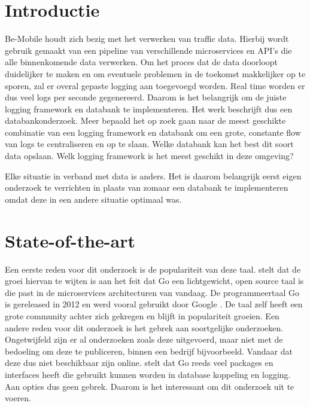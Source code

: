 
\section{Introductie} %
\label{sec:introductie}
Be-Mobile houdt zich bezig met het verwerken van traffic data. Hierbij wordt gebruik gemaakt van een pipeline van verschillende microservices en API's die alle binnenkomende data verwerken. Om het proces dat de data doorloopt duidelijker te maken en om eventuele problemen in de toekomst makkelijker op te sporen, zal er overal gepaste logging aan toegevoegd worden. Real time worden er dus veel logs per seconde gegenereerd. Daarom is het belangrijk om de juiste logging framework en databank te implementeren. Het werk beschrijft dus een databankonderzoek. Meer bepaald het op zoek gaan naar de meest geschikte combinatie van een logging framework en databank om een grote, constante flow van logs te centraliseren en op te slaan. Welke databank kan het best dit soort data opslaan. Welk logging framework is het meest geschikt in deze omgeving?
 
 Elke situatie in verband met data is anders. Het is daarom belangrijk eerst eigen onderzoek te verrichten in plaats van zomaar een databank te implementeren omdat deze in een andere situatie optimaal was.

\section{State-of-the-art}
\label{sec:state-of-the-art}
Een eerste reden voor dit onderzoek is de populariteit van deze taal. \textcite{Rouse} stelt dat de groei hiervan te wijten is aan het feit dat Go een lichtgewicht, open source taal is die past in de microservices architecturen van vandaag. De programmeertaal Go is gereleased in 2012 en werd vooral gebruikt door Google \autocite{Golang}. De taal zelf heeft een grote community achter zich gekregen en blijft in populariteit groeien. Een andere reden voor dit onderzoek is het gebrek aan soortgelijke onderzoeken. Ongetwijfeld zijn er al onderzoeken zoals deze uitgevoerd, maar niet met de bedoeling om deze te publiceren, binnen een bedrijf bijvoorbeeld. Vandaar dat deze dus niet beschikbaar zijn online.  \textcite{Garcin} stelt dat Go reeds veel packages en interfaces heeft die gebruikt kunnen worden in database koppeling en logging. Aan opties dus geen gebrek. Daarom is het interessant om dit onderzoek uit te voeren.



